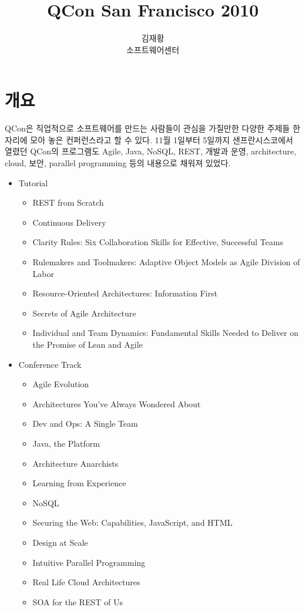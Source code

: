 \documentclass[11pt]{article}
\title{QCon San Francisco 2010}
\author{김재황 \\ 소프트웨어센터}
\begin{document}
\maketitle

\section{개요}

QCon은 직업적으로 소프트웨어를 만드는 사람들이 관심을 가질만한 
다양한 주제들 한 자리에 모아 놓은 컨퍼런스라고 할 수 있다. 11월 1일부터 5일까지
샌프란시스코에서 열렸던 QCon의 프로그램도 Agile, Java, NoSQL, REST, 
개발과 운영, architecture, cloud, 보안, parallel programming
등의 내용으로 채워져 있었다. 

\begin{itemize}
\item Tutorial
    \begin{itemize}
    \item REST from Scratch
    \item Continuous Delivery
    \item  Clarity Rules: Six Collaboration Skills for Effective, Successful Teams
    \item Rulemakers and Toolmakers: Adaptive Object Models as Agile Division of Labor
    \item Resource-Oriented Architectures: Information First
    \item Secrets of Agile Architecture
    \item Individual and Team Dynamics: Fundamental Skills Needed to Deliver on the Promise of Lean and Agile
    \end{itemize}
\item Conference Track
    \begin{itemize}
    \item Agile Evolution
    \item Architectures You've Always Wondered About
    \item Dev and Ops: A Single Team
    \item Java, the Platform
    \item Architecture Anarchists
    \item Learning from Experience
    \item NoSQL
    \item Securing the Web: Capabilities, JavaScript, and HTML
    \item Design at Scale
    \item Intuitive Parallel Programming
    \item Real Life Cloud Architectures
    \item SOA for the REST of Us
    \end{itemize}
\end{itemize}
\end{document}
